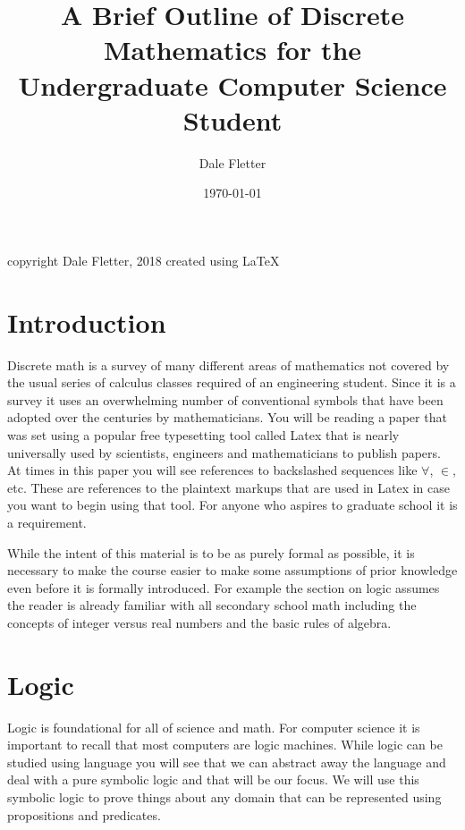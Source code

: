 \documentclass[11pt]{book} %
\title{A Brief Outline of Discrete Mathematics for the Undergraduate Computer Science Student}
\author{Dale Fletter}
\date{\today} %
\theoremstyle {definition}
\theoremstyle {remark}
\begin{document}
\frontmatter        
        \maketitle
        copyright Dale Fletter, 2018
        created using \LaTeX\ 
        \setcounter{tocdepth}{1}
        \tableofcontents
        



\newpage
 



\chapter {Introduction}
Discrete math is a survey of many different areas of mathematics not covered by the usual series of calculus classes required of an engineering student. Since it is a survey it uses an overwhelming number of conventional symbols that have been adopted over the centuries by mathematicians. You will be reading a paper that was set using a popular free typesetting tool called Latex that is nearly universally used by scientists, engineers and mathematicians to publish papers. At times in this paper you will see references to backslashed sequences like $\forall$, $\in$, etc. These are references to the plaintext markups that are used in Latex in case you want to begin using that tool. For anyone who aspires to graduate school it is a requirement.


While the intent of this material is to be as purely formal as possible, it is necessary to make the course easier to make some assumptions of prior knowledge even before it is formally introduced. For example the section on logic assumes the reader is already familiar with all secondary school math including the concepts of integer versus real numbers and the basic rules of algebra.

\mainmatter

\newpage


\chapter {Logic}
Logic is foundational for all of science and math. For computer science it is important to recall that most computers are logic machines. While logic can be studied using language you will see that we can abstract away the language and deal with a pure symbolic logic and that will be our focus. We will use this symbolic logic to prove things about any domain that can be represented using propositions and predicates.
\end{document}

